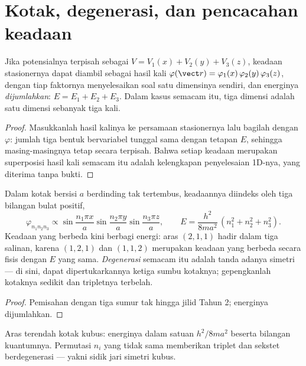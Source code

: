 \section{Kotak, degenerasi, dan pencacahan keadaan}

\begin{theorem}\label{thm:b3:schrodinger-three-dimensions:separation}
Jika potensialnya terpisah sebagai $V = V_1(x) + V_2(y) + V_3(z)$,
keadaan stasionernya dapat diambil sebagai hasil kali
$\varphi(\vect r) = \varphi_1(x)\,\varphi_2(y)\,\varphi_3(z)$, dengan
tiap faktornya menyelesaikan soal satu dimensinya sendiri, dan
energinya \emph{dijumlahkan}: $E = E_1 + E_2 + E_3$. Dalam kasus
semacam itu, tiga dimensi adalah satu dimensi sebanyak tiga kali.
\end{theorem}

\begin{proof}
Masukkanlah hasil kalinya ke persamaan stasionernya lalu bagilah dengan
$\varphi$: jumlah tiga bentuk bervariabel tunggal sama dengan tetapan
$E$, sehingga masing-masingnya tetap secara terpisah. Bahwa setiap
keadaan merupakan superposisi hasil kali semacam itu adalah kelengkapan
penyelesaian 1D-nya, yang diterima tanpa bukti.
\end{proof}

\begin{proposition}\label{prop:b3:schrodinger-three-dimensions:box}
Dalam kotak bersisi $a$ berdinding tak tertembus, keadaannya diindeks
oleh tiga bilangan bulat positif,
\[
\varphi_{n_1n_2n_3} \propto
\sin\frac{n_1\pi x}{a}\sin\frac{n_2\pi y}{a}\sin\frac{n_3\pi z}{a} ,
\qquad
E = \frac{h^2}{8ma^2}\,(n_1^2 + n_2^2 + n_3^2) .
\]
Keadaan yang berbeda kini berbagi energi: aras $(2,1,1)$ hadir dalam
tiga salinan, karena $(1,2,1)$ dan $(1,1,2)$ merupakan keadaan yang
berbeda secara fisis dengan $E$ yang sama. \emph{Degenerasi} semacam itu
adalah tanda adanya simetri --- di sini, dapat dipertukarkannya ketiga
sumbu kotaknya; gepengkanlah kotaknya sedikit dan tripletnya terbelah.
\end{proposition}

\begin{proof}
Pemisahan dengan tiga sumur tak hingga jilid Tahun 2; energinya
dijumlahkan.
\end{proof}

\begin{omfigure}

{\small Aras terendah kotak kubus: energinya dalam satuan
$h^2/8ma^2$ beserta bilangan kuantumnya. Permutasi $n_i$ yang tidak sama
memberikan triplet dan sekstet berdegenerasi --- yakni sidik jari
simetri kubus.}
\end{omfigure}

